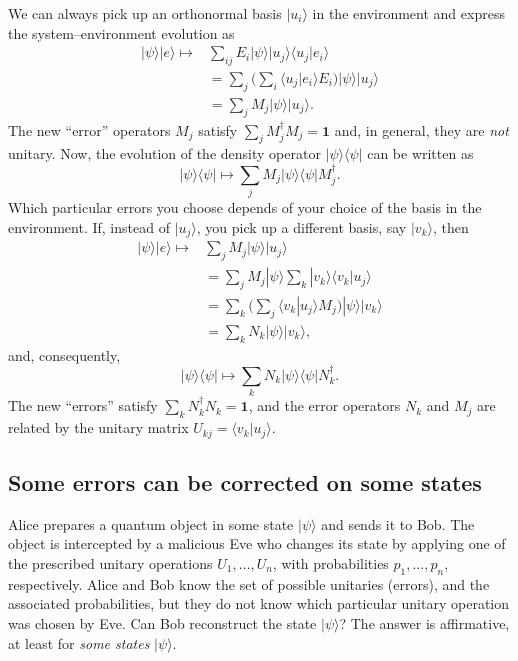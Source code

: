 \documentclass[fleqn]{article}
\begin{document}
We can always pick up an orthonormal basis \(|u_i\rangle\) in the environment and express the system--environment evolution as
\[
  \begin{aligned}
    |\psi\rangle|e\rangle
    \longmapsto &\sum_{ij} E_i|\psi\rangle|u_j\rangle\langle u_j|e_i\rangle
    \\&= \sum_{j}\Big( \sum_i \langle u_j|e_i\rangle E_i\Big)|\psi\rangle|u_j\rangle
    \\&= \sum_j M_j|\psi\rangle|u_j\rangle.
  \end{aligned}
\]
The new ``error'' operators \(M_j\) satisfy \(\sum_j M_j^\dagger M_j =\mathbf{1}\) and, in general, they are \emph{not} unitary.
Now, the evolution of the density operator \(|\psi\rangle\langle\psi|\) can be written as
\[
  |\psi\rangle\langle\psi|\longmapsto \sum_j M_j|\psi\rangle\langle\psi| M_j^\dagger.
\]
Which particular errors you choose depends of your choice of the basis in the environment.
If, instead of \(|u_j\rangle\), you pick up a different basis, say \(|v_k\rangle\), then
\[
  \begin{aligned}
    |\psi\rangle|e\rangle
    \longmapsto &\sum_j M_j|\psi\rangle|u_j\rangle
  \\&= \sum_j M_j |\psi\rangle\sum_k|v_k\rangle\langle v_k|u_j\rangle
  \\&= \sum_k \Big(\sum_j \langle v_k|u_j\rangle M_j \Big)|\psi\rangle|v_k\rangle
  \\&= \sum_k N_k|\psi\rangle|v_k\rangle,
  \end{aligned}
\]
and, consequently,
\[
  |\psi\rangle\langle\psi|\longmapsto \sum_k N_k|\psi\rangle\langle\psi| N_k^\dagger.
\]
The new ``errors'' satisfy \(\sum_k N_k^\dagger N_k = \mathbf{1}\), and the error operators \(N_k\) and \(M_j\) are related by the unitary matrix \(U_{kj}=\langle v_k|u_j\rangle\).

\hypertarget{some-errors-can-be-corrected-on-some-states}{%
\subsection{Some errors can be corrected on some states}\label{some-errors-can-be-corrected-on-some-states}}

Alice prepares a quantum object in some state \(|\psi\rangle\) and sends it to Bob.
The object is intercepted by a malicious Eve who changes its state by applying one of the prescribed unitary operations \(U_1,\ldots, U_n\), with probabilities \(p_1,\ldots, p_n\), respectively.
Alice and Bob know the set of possible unitaries (errors), and the associated probabilities, but they do not know which particular unitary operation was chosen by Eve.
Can Bob reconstruct the state \(|\psi\rangle\)?
The answer is affirmative, at least for \emph{some states} \(|\psi\rangle\).
\end{document}
